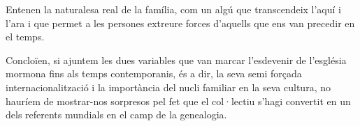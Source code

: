     Entenen la naturalesa real de la família, com un algú que transcendeix l'aquí i l'ara i que permet a les persones extreure forces d'aquells que ens van precedir en el temps.

    Concloïen, si ajuntem les dues variables que van marcar l'esdevenir de l'església mormona fins als temps contemporanis, és a dir, la seva semi forçada in\-ter\-na\-cio\-na\-lit\-za\-ció i la importància del nucli familiar en la seva cultura, no hauríem de mos\-trar-nos sorpresos pel fet que el col·lectiu s'hagi convertit en un dels referents mundials en el camp de la genealogia.
